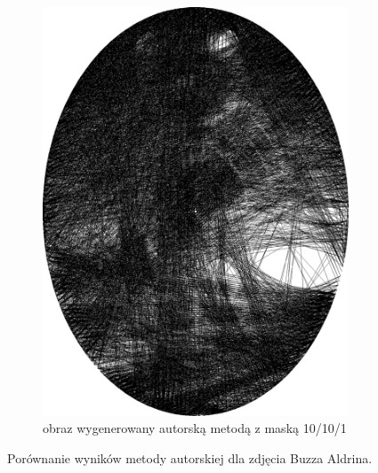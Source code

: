 \begin{figure}[H]
\begin{subfigure}{0.24\textwidth}
            \includegraphics[width = \textwidth]{img/6-comp/aldrin_e_i3500_c20_inv0_bg10_obj10_ed1.png}
            \caption{obraz wygenerowany autorską metodą z maską 10/10/1}
            \label{comp-comp-aldrin-h}
        \end{subfigure}
        \caption{Porównanie wyników metody autorskiej dla zdjęcia Buzza Aldrina.}
        \label{comp-comp-aldrin}
        \end{figure}
        
